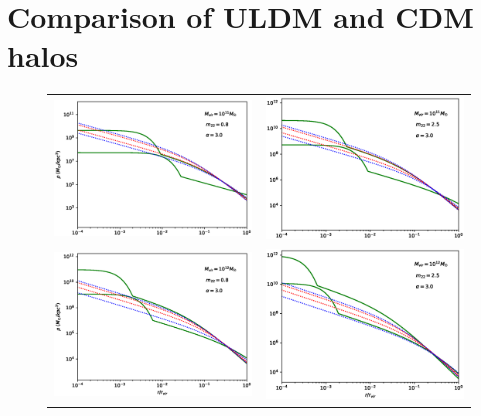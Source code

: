 \documentclass[a4paper,11pt]{article}
\begin{document}
\section{Comparison of ULDM and CDM halos}\label{sec:ULDM_v_CDM}

\begin{figure}
\begin{tabular}{cc}
{\includegraphics[width = 3.1in, trim={2.1cm 0.5cm 0cm 0.5cm}]{pics/11_8_3.eps}} &
{\includegraphics[width = 3.1in, trim={2.1cm 0.5cm 0cm 0.5cm}]{pics/11_25_3.eps}}\\
{\includegraphics[width = 3.1in, trim={2.1cm 0.5cm 0cm 0.5cm}]{pics/12_8_3.eps}} &
{\includegraphics[width = 3.1in, trim={2.1cm 0.5cm 0cm 0.5cm}]{pics/12_25_3.eps}}

\end{tabular}
\end{figure}
\end{document}
